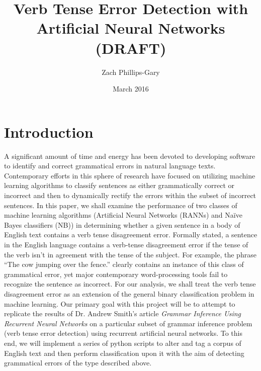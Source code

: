 \documentclass{article}
\title{Verb Tense Error Detection with Artificial Neural Networks (DRAFT)}
\author{Zach Phillips-Gary}
\date{March 2016}
\begin{document}
\maketitle

\section{Introduction}
A significant amount of time and energy has been devoted to developing software to identify and correct grammatical errors in natural language texts. Contemporary efforts in this sphere of research have focused on utilizing machine learning algorithms to classify sentences as either grammatically correct or incorrect and then to dynamically rectify the errors within the subset of incorrect sentences.  In this paper, we shall examine the performance of two classes of machine learning algorithms (Artificial Neural Networks (RANNs) and Naïve Bayes classifiers (NB)) in determining whether a given sentence in a body of English text contains a verb tense disagreement error. Formally stated, a sentence in the English language contains a verb-tense disagreement error if the tense of the verb isn’t in agreement with the tense of the subject. For example, the phrase “The cow jumping over the fence.” clearly contains an instance of this class of grammatical error, yet major contemporary word-processing tools fail to recognize the sentence as incorrect. For our analysis, we shall treat the verb tense disagreement error as an extension of the general binary classification problem in machine learning. Our primary goal with this project will be to attempt to replicate the results of Dr. Andrew Smith's article \textit{Grammar Inference Using Recurrent Neural Networks} \citep{Smith_grammarinference} on a particular subset of grammar inference problem (verb tense error detection) using recurrent artificial neural networks. To this end, we will implement a series of python scripts to alter and tag a corpus of English text and then perform classification upon it with the aim of detecting grammatical errors of the type described above.
\end{document}
